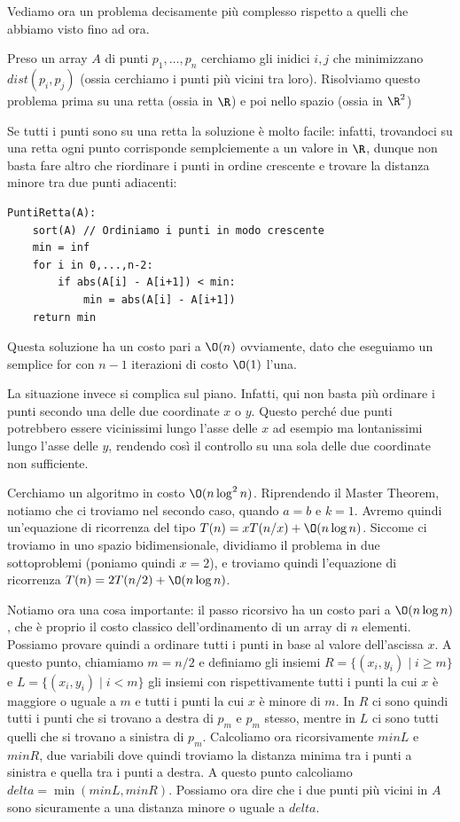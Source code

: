 \documentclass[11pt, a4paper, titlepage, oneside]{scrbook}
\begin{document}
Vediamo ora un problema decisamente più complesso rispetto a quelli che abbiamo visto fino ad ora.

Preso un array $A$ di punti $p_1,\ldots, p_n$ cerchiamo gli inidici $i,j$ che minimizzano $dist(p_i,p_j)$ (ossia cerchiamo i punti più vicini tra loro). Risolviamo questo problema prima su una retta (ossia in $\R$) e poi nello spazio (ossia in $\R^2$)

Se tutti i punti sono su una retta la soluzione è molto facile: infatti, trovandoci su una retta ogni punto corrisponde semplciemente a un valore in $\R$, dunque non basta fare altro che riordinare i punti in ordine crescente e trovare la distanza minore tra due punti adiacenti:

\begin{lstlisting}
PuntiRetta(A):
    sort(A) // Ordiniamo i punti in modo crescente
    min = inf
    for i in 0,...,n-2:
        if abs(A[i] - A[i+1]) < min:
            min = abs(A[i] - A[i+1])
    return min 
\end{lstlisting}

Questa soluzione ha un costo pari a $\O(n)$ ovviamente, dato che eseguiamo un semplice for con $n-1$ iterazioni di costo $\O(1)$ l'una.

La situazione invece si complica sul piano. Infatti, qui non basta più ordinare i punti secondo una delle due coordinate $x$ o $y$. Questo perché due punti potrebbero essere vicinissimi lungo l'asse delle $x$ ad esempio ma lontanissimi lungo l'asse delle $y$, rendendo così il controllo su una sola delle due coordinate non sufficiente.

Cerchiamo un algoritmo in costo $\O(n \log^2 n)$. Riprendendo il Master Theorem, notiamo che ci troviamo nel secondo caso, quando $a = b$ e $k = 1$. Avremo quindi un'equazione di ricorrenza del tipo $T(n) = x T(n/x) + \O(n \log n)$. Siccome ci troviamo in uno spazio bidimensionale, dividiamo il problema in due sottoproblemi (poniamo quindi $x = 2$), e troviamo quindi l'equazione di ricorrenza $T(n) = 2 T(n/2) + \O(n \log n)$. 

Notiamo ora una cosa importante: il passo ricorsivo ha un costo pari a $\O(n \log n)$, che è proprio il costo classico dell'ordinamento di un array di $n$ elementi. Possiamo provare quindi a ordinare tutti i punti in base al valore dell'ascissa $x$. A questo punto, chiamiamo $m = n/2$ e definiamo gli insiemi $R = \{(x_i, y_i) \mid i \geq m\}$ e $L = \{(x_i, y_i) \mid i < m\}$ gli insiemi con rispettivamente tutti i punti la cui $x$ è maggiore o uguale a $m$ e tutti i punti la cui $x$ è minore di $m$. In $R$ ci sono quindi tutti i punti che si trovano a destra di $p_m$ e $p_m$ stesso, mentre in $L$ ci sono tutti quelli che si trovano a sinistra di $p_m$. Calcoliamo ora ricorsivamente $minL$ e $minR$, due variabili dove quindi troviamo la distanza minima tra i punti a sinistra e quella tra i punti a destra. A questo punto calcoliamo $delta = \min(minL, minR)$. Possiamo ora dire che i due punti più vicini in $A$ sono sicuramente a una distanza minore o uguale a $delta$. 
\end{document}
